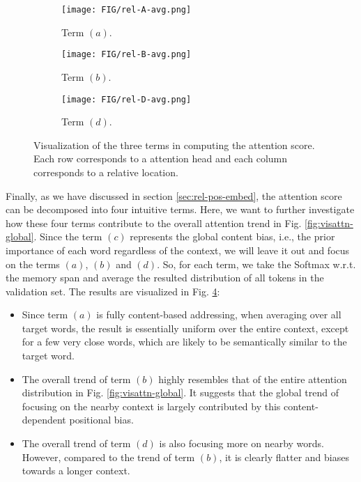 \documentclass[11pt,a4paper]{article}
\begin{document}
\begin{figure}[!h]
	\begin{subfigure}[b]{\linewidth}
		\texttt{[image: FIG/rel-A-avg.png]}
		\caption{Term $(a)$.}
		\label{fig:visattn-A}
	\end{subfigure}
	\begin{subfigure}[b]{\linewidth}
		\texttt{[image: FIG/rel-B-avg.png]}
		\caption{Term $(b)$.}
		\label{fig:visattn-B}
	\end{subfigure}
	\begin{subfigure}[b]{\linewidth}
		\texttt{[image: FIG/rel-D-avg.png]}
		\caption{Term $(d)$.}
		\label{fig:visattn-D}
	\end{subfigure}
	\caption{Visualization of the three terms in computing the attention score. Each row corresponds to a attention head and each column corresponds to a relative location.}
	\label{fig:visattn-decomp}
\end{figure}
Finally, as we have discussed in section \ref{sec:rel-pos-embed}, the attention score can be decomposed into four intuitive terms.
Here, we want to further investigate how these four terms contribute to the overall attention trend in Fig. \ref{fig:visattn-global}.
Since the term $(c)$ represents the global content bias, i.e., the prior importance of each word regardless of the context, we will leave it out and focus on the terms $(a)$, $(b)$ and $(d)$.
So, for each term, we take the Softmax w.r.t. the memory span and average the resulted distribution of all tokens in the validation set.
The results are visualized in Fig. \ref{fig:visattn-decomp}:
\begin{itemize}[leftmargin=*]
	\item Since term $(a)$ is fully content-based addressing, when averaging over all target words, the result is essentially uniform over the entire context, except for a few very close words, which are likely to be semantically similar to the target word.
	\item The overall trend of term $(b)$ highly resembles that of the entire attention distribution in Fig. \ref{fig:visattn-global}. It suggests that the global trend of focusing on the nearby context is largely contributed by this content-dependent positional bias.
	\item The overall trend of term $(d)$ is also focusing more on nearby words. However, compared to the trend of term $(b)$, it is clearly flatter and biases towards a longer context.
\end{itemize}
\end{document}
